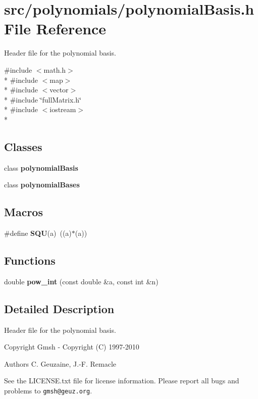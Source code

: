 \section{src/polynomials/polynomial\-Basis.h File Reference}
\label{polynomialBasis_8h}


Header file for the polynomial basis.  


{\ttfamily \#include $<$math.\-h$>$}\\*
{\ttfamily \#include $<$map$>$}\\*
{\ttfamily \#include $<$vector$>$}\\*
{\ttfamily \#include \char`\"{}full\-Matrix.\-h\char`\"{}}\\*
{\ttfamily \#include $<$iostream$>$}\\*
\subsection*{Classes}
\begin{DoxyCompactItemize}
\item 
class {\bf polynomial\-Basis}
\item 
class {\bf polynomial\-Bases}
\end{DoxyCompactItemize}
\subsection*{Macros}
\begin{DoxyCompactItemize}
\item 
\#define {\bfseries S\-Q\-U}(a)~((a)$\ast$(a))\label{polynomialBasis_8h_abcfa50d0f362fac398bc12c10f6d9fca}

\end{DoxyCompactItemize}
\subsection*{Functions}
\begin{DoxyCompactItemize}
\item 
double {\bfseries pow\-\_\-int} (const double \&a, const int \&n)\label{polynomialBasis_8h_a54b486a484bc0cc4f8dad5422c7991cf}

\end{DoxyCompactItemize}


\subsection{Detailed Description}
Header file for the polynomial basis. \begin{DoxyCopyright}{Copyright}
Gmsh -\/ Copyright (C) 1997-\/2010 
\end{DoxyCopyright}
\begin{DoxyAuthor}{Authors}
C. Geuzaine, J.-\/\-F. Remacle
\end{DoxyAuthor}
See the L\-I\-C\-E\-N\-S\-E.\-txt file for license information. Please report all bugs and problems to {\tt gmsh@geuz.\-org}. 